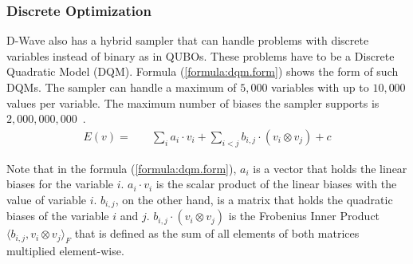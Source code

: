 \subsubsection{Discrete Optimization}

D-Wave also has a hybrid sampler that can handle problems with discrete variables instead of binary as in QUBOs.
These problems have to be a Discrete Quadratic Model (DQM).
Formula (\ref{formula:dqm.form}) shows the form of such DQMs.
The sampler can handle a maximum of $5, 000$ variables with up to $10, 000$ values per variable.
The maximum number of biases the sampler supports is $2, 000, 000, 000$~\cite{DQMHybrid2020}.
\begin{align}
  \label{formula:dqm.form}
  E(v) =
  & \quad \sum_i a_i \cdot v_i + \sum_{i < j} b_{i, j} \cdot \left( v_i \otimes v_j \right) + c
\end{align}

Note that in the formula (\ref{formula:dqm.form}), $a_i$ is a vector that holds the linear biases for the variable $i$.
$a_i \cdot v_i$ is the scalar product of the linear biases with the value of variable $i$.
$b_{i, j}$, on the other hand, is a matrix that holds the quadratic biases of the variable $i$ and $j$.
$b_{i, j} \cdot \left( v_i \otimes v_j \right)$ is the Frobenius Inner Product $\langle b_{i, j}, v_i \otimes v_j \rangle_F$ that is defined as the sum of all elements of both matrices multiplied element-wise.
